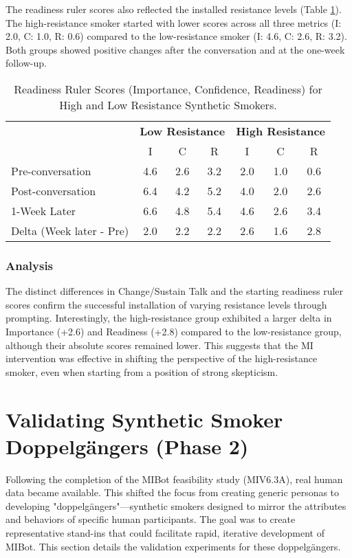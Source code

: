 The readiness ruler scores also reflected the installed resistance levels (Table \ref{tab:resistance_readiness_rulers}). The high-resistance smoker started with lower scores across all three metrics (I: 2.0, C: 1.0, R: 0.6) compared to the low-resistance smoker (I: 4.6, C: 2.6, R: 3.2). Both groups showed positive changes after the conversation and at the one-week follow-up.

\begin{table}[h]
\centering
\caption{Readiness Ruler Scores (Importance, Confidence, Readiness) for High and Low Resistance Synthetic Smokers.}
\label{tab:resistance_readiness_rulers}
\begin{tabular}{|l|ccc|ccc|}
\hline
 & \multicolumn{3}{c|}{\textbf{Low Resistance}} & \multicolumn{3}{c|}{\textbf{High Resistance}} \\
 & I & C & R & I & C & R \\ \hline
Pre-conversation & 4.6 & 2.6 & 3.2 & 2.0 & 1.0 & 0.6 \\
Post-conversation & 6.4 & 4.2 & 5.2 & 4.0 & 2.0 & 2.6 \\
1-Week Later & 6.6 & 4.8 & 5.4 & 4.6 & 2.6 & 3.4 \\ \hline
Delta (Week later - Pre) & 2.0 & 2.2 & 2.2 & 2.6 & 1.6 & 2.8 \\ \hline
\end{tabular}
\end{table}

\subsubsection{Analysis}

The distinct differences in Change/Sustain Talk and the starting readiness ruler scores confirm the successful installation of varying resistance levels through prompting. Interestingly, the high-resistance group exhibited a larger delta in Importance (+2.6) and Readiness (+2.8) compared to the low-resistance group, although their absolute scores remained lower. This suggests that the MI intervention was effective in shifting the perspective of the high-resistance smoker, even when starting from a position of strong skepticism.

\section{Validating Synthetic Smoker Doppelgängers (Phase 2)}

Following the completion of the MIBot feasibility study (MIV6.3A), real human data became available. This shifted the focus from creating generic personas to developing "doppelgängers"—synthetic smokers designed to mirror the attributes and behaviors of specific human participants. The goal was to create representative stand-ins that could facilitate rapid, iterative development of MIBot. This section details the validation experiments for these doppelgängers.

